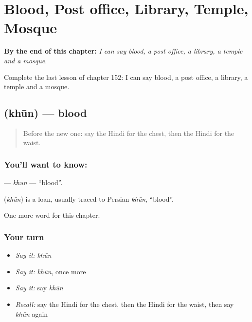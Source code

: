 
\chapter{Blood, Post office, Library, Temple, Mosque}
\label{ch:hi-blood-post-office-library-temple-mosque}

\begin{chapteropening}
\textbf{By the end of this chapter:} \emph{I can say blood, a post office, a library, a temple and a mosque.}

Complete the last lesson of chapter 152: I can say blood, a post office, a library, a temple and a mosque.
\end{chapteropening}

\section[\texorpdfstring{\hi{ख़ून} (khūn)}{ख़ून (khūn)}]{ (khūn) — blood}

\label{lesson:HI-C152-khun}



\begin{quote}
Before the new one: say the Hindi for the chest, then the Hindi for the waist.
\end{quote}

\subsection*{You'll want to know: }
\textbf{} — \emph{khūn} — \textquotedblleft{}blood\textquotedblright{}.

\begin{cousinweb}
\textbf{} (\emph{khūn}) is a loan, usually traced to Persian \emph{khūn}, \textquotedblleft{}blood\textquotedblright{}.
\end{cousinweb}

\begin{grammarlens}[title={What you've built}]
One more word for this chapter.
\end{grammarlens}

\subsection*{Your turn}
\begin{itemize}
\raggedright
  \item \emph{Say it:} \emph{khūn}
  \item \emph{Say it:} \emph{khūn}, once more
  \item \emph{Say it:} say \emph{khūn}
  \item \emph{Recall:} say the Hindi for the chest, then the Hindi for the waist, then say \emph{khūn} again
\end{itemize}

